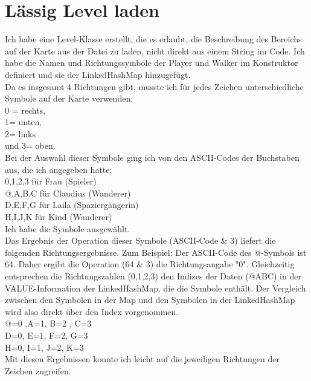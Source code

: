 \documentclass{pi1}
\begin{document}


\section{Lässig Level laden}

Ich habe eine Level-Klasse erstellt, die es erlaubt, die Beschreibung des Bereichs auf der Karte aus der Datei zu laden, nicht direkt aus einem String im Code.
Ich habe die Namen und Richtungssymbole der Player und Walker im Konstruktor definiert und sie der LinkedHashMap hinzugefügt.\\

Da es insgesamt 4 Richtungen gibt, musste ich für jedes Zeichen unterschiedliche Symbole auf der Karte verwenden:\\
0 = rechts,\\ 1= unten,\\ 2= links\\ und 3= oben.\\
Bei der Auswahl dieser Symbole ging ich von den ASCII-Codes der Buchstaben aus, die ich angegeben hatte;\\
0,1,2,3 für Frau (Spieler)\\
@,A,B,C für Claudius (Wanderer)\\
D,E,F,G für Laila (Spaziergängerin)\\
H,I,J,K für Kind (Wanderer)\\
Ich habe die Symbole ausgewählt.\\

Das Ergebnis der Operation dieser Symbole (ASCII-Code \& 3) liefert die folgenden Richtungsergebnisse. Zum Beispiel: Der ASCII-Code des @-Symbols ist 64. Daher ergibt die Operation (64 \& 3) die Richtungsangabe "0". Gleichzeitig entsprechen die Richtungszahlen (0,1,2,3) den Indizes der Daten (@ABC) in der VALUE-Information der LinkedHashMap, die die Symbole enthält. Der Vergleich zwischen den Symbolen in der Map und den Symbolen in der LinkedHashMap wird also direkt über den Index vorgenommen.\\
@=0 ,A=1, B=2 , C=3\\
D=0, E=1, F=2, G=3\\
H=0, I=1, J=2, K=3\\
Mit diesen Ergebnissen konnte ich leicht auf die jeweiligen Richtungen der Zeichen zugreifen.
\end{document}
